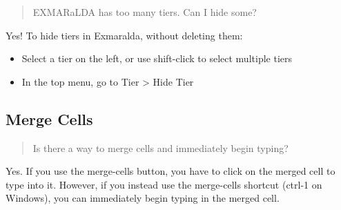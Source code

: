 \documentclass[
]{book}
\providecommand{\tightlist}{%
  \setlength{\itemsep}{0pt}\setlength{\parskip}{0pt}}
\begin{document}
\begin{quote}
EXMARaLDA has too many tiers. Can I hide some?
\end{quote}

Yes! To hide tiers in Exmaralda, without deleting them:

\begin{itemize}
\tightlist
\item
  Select a tier on the left, or use shift-click to select multiple tiers
\item
  In the top menu, go to Tier \textgreater{} Hide Tier
\end{itemize}

\hypertarget{merge-cells}{%
\subsection{Merge Cells}\label{merge-cells}}

\begin{quote}
Is there a way to merge cells and immediately begin typing?
\end{quote}

Yes.
If you use the merge-cells button, you have to click on the merged cell to type into it.
However, if you instead use the merge-cells shortcut (ctrl-1 on Windows), you can immediately begin typing in the merged cell.
\end{document}

